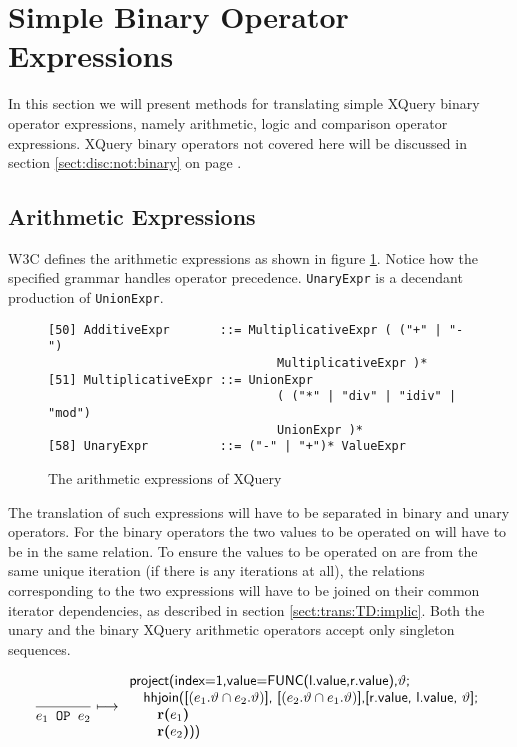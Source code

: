 \section{Simple Binary Operator Expressions}
\label{sect:trans:TD:binary}

In this section we will present methods for translating simple XQuery binary
operator expressions, namely arithmetic, logic and comparison operator expressions. XQuery binary operators not covered here will be discussed
in section \ref{sect:disc:not:binary} on page \pageref{sect:disc:not:binary}.

\subsection{Arithmetic Expressions}
\label{sect:trans:TD:atrith}
W3C defines the arithmetic expressions as shown in figure \ref{fig:trans:TD:arithEBNF}\cite{w3c00}. Notice how the
specified grammar handles operator precedence. \texttt{UnaryExpr} is a decendant production of \texttt{UnionExpr}.

\begin{figure}[h]
\begin{Verbatim}
[50] AdditiveExpr       ::= MultiplicativeExpr ( ("+" | "-") 
                                MultiplicativeExpr )*
[51] MultiplicativeExpr ::= UnionExpr 
                                ( ("*" | "div" | "idiv" | "mod")
                                UnionExpr )*
[58] UnaryExpr          ::= ("-" | "+")* ValueExpr
\end{Verbatim}
\caption{The arithmetic expressions of XQuery}
\label{fig:trans:TD:arithEBNF}
\end{figure}

The translation of such expressions will have to be separated in binary and unary operators. For the binary
operators the two values to be operated on will have to be in the same relation. To ensure the values to be
operated on are from the same unique iteration (if there is any iterations at all), the relations corresponding to
the two expressions will have to be joined on their common iterator dependencies, as described in section
\ref{sect:trans:TD:implic}. Both the unary and the binary XQuery arithmetic operators accept only singleton
sequences.

\begin{equation}
\frac{}{e_1 \mbox{\texttt{ OP }} e_2}\longmapsto
\begin{array}{l}
\mbox{\textsf{project(index=1,value=FUNC(l.value,r.value),}}\vartheta\mbox{\textsf{;}} \\ \quad
\mbox{\textsf{hhjoin([}}(e_1.\vartheta\cap e_2.\vartheta)\mbox{\textsf{], [}}(e_2.\vartheta\cap e_1.\vartheta)
\mbox{\textsf{],}} 
\mbox{\textsf{[r.value, l.value, }}\vartheta\mbox{\textsf{];}} \\ \quad \quad
\mbox{\textbf{r(}}e_1\mbox{\textbf{)}} \\ \quad \quad
\mbox{\textbf{r(}}e_2\mbox{\textbf{)}\textsf{))}}
\end{array}
\label{rule:trans:TD:arithmetic}
\end{equation}

